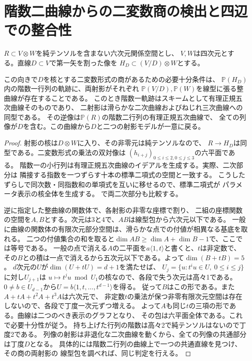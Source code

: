 \section{階数二曲線からの二変数商の検出と四辺での整合性}
\label{sec:binary-window-transfer}
$R\subset V\otimes W$を純テンソルを含まない六次元関係空間とし、
$V,W$は四次元とする。直線$D\subset V$で第一矢を割った像を
$H_D\subset(V/D)\otimes W$とする。
\begin{proposition}\label{prop:binary-quotient-rank-two-curve}
この向きで$D$を核とする二変数形式の商があるための必要十分条件は、
$\mathbb P(H_D)$内の階数一行列の軌跡に、両射影がそれぞれ
$\mathbb P(V/D),\mathbb P(W)$を線型に張る整曲線が存在することである。
このとき階数一軌跡はスキームとして有理正規五次曲線そのものであり、
二射影は滑らかな二次曲線およびねじれ三次曲線への同型である。
その逆像は$\mathbb P(R)$の階数二行列の有理正規五次曲線で、
全ての列像が$D$を含む。この曲線から$D$と二つの射影モデルが一意に戻る。
\end{proposition}
\begin{proof}
射影の核は$D\otimes W$に入り、その非零元は純テンソルなので、
$R\to H_D$は同型である。二変数形式の乗法の双対像は
$(h_{i+j})_{0\le i\le2,0\le j\le3}$の六平面である。
階数一の小行列は有理正規五次曲線のイデアルを生成する。実際、二次部分は
隣接する指数を一つずらす十本の標準二項式の空間と一致する。
こうしたずらしで同次数・同指数和の単項式を互いに移せるので、標準二項式が
パラメータ表示の核全体を生成する。
で両二次部分も比較する。

逆に指定した整曲線の関数体で、各射影の非零な座標で割り、
二組の座標関数の空間を$A,B$とする。次元は3と4で、$AB$は線型包から六次元以下である。
一般に曲線の関数体の有限次元部分空間は、滑らかな点での付値が相異なる基底を取れる。
二つの付値集合の和を取ると$\dim AB\ge\dim A+\dim B-1$で、ここでは等号である。
一般の点で消える$A$の二平面を$a\langle1,t\rangle$と書くと、$t$は非定数で、
その$B$との積は一点で消えるから五次元以下である。よって$\dim(B+tB)=5$。
$d$次元の$U$が$\dim(U+tU)=d+1$を満たせば、
$U_j=\{u:t^i u\in U,\ 0\le i\le j\}$に対し$U_{j+1}$は
$u\mapsto t^ju\bmod U_1$の核なので、各段で失う次元は高々1である。
$0\ne b\in U_{d-1}$から$U=b\langle1,t,\ldots,t^{d-1}\rangle$を得る。
従って$B$はこの形である。また$A+tA+t^2A+t^3A$は六次元で、
非定数$t$の乗法が保つ非零有限次元空間は存在しないので、各段で丁度一次元ずつ増える。
よって$A$も同じ$t$の三項の形である。曲線は二つのべき表示のグラフとなり、
その包は六平面全体である。これで必要十分性が従う。
持ち上げた行列の階数は高々2で純テンソルはないので丁度2である。
列像の射影は非退化な二次曲線を動くから、全ての列像の共通部分は丁度$D$となる。
具体的には階数二行列の曲線上で一つの共通直線を見つけ、その商の両射影の
線型包を調べれば、同じ判定を行える。
\end{proof}


